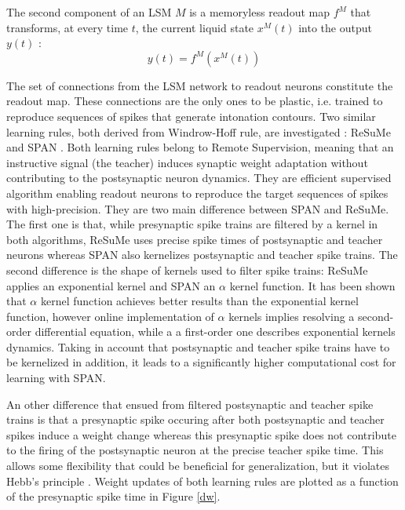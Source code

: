 \documentclass[11pt, a4paper]{article} %
\begin{document}
The second component of an LSM $M$ is a memoryless readout map $f^M$ that transforms, at every time $t$, the current liquid state $x^M(t)$ into the output $y(t)$ \cite{maass2002real}: \begin{equation}
y(t) = f^M(x^M(t))
\end{equation}

The set of connections from the LSM network to readout neurons constitute the readout map. These connections are the only ones to be plastic, i.e. trained to reproduce sequences of spikes that generate intonation contours. Two similar learning rules, both derived from Windrow-Hoff rule, are investigated : ReSuMe \cite{ponulak2006supervised, ponulak2010supervised} and SPAN \cite{mohemmed2012span, mohemmed2013training}. Both learning rules belong to Remote Supervision, meaning that an instructive signal (the teacher) induces synaptic weight adaptation without contributing to the postsynaptic neuron dynamics. They are efficient supervised algorithm enabling readout neurons to reproduce the target sequences of spikes with high-precision. They are two main difference between SPAN and ReSuMe. The first one is that, while presynaptic spike trains are filtered by a kernel in both algorithms, ReSuMe uses precise spike times of postsynaptic and teacher neurons whereas SPAN also kernelizes postsynaptic and teacher spike trains. The second difference is the shape of kernels used to filter spike trains: ReSuMe applies an exponential kernel and SPAN an $\alpha$ kernel function. It has been shown that $\alpha$ kernel  function achieves better results than the exponential kernel function, however online implementation of $\alpha$ kernels implies resolving a second-order differential equation, while a a first-order one describes exponential kernels dynamics. Taking in account that postsynaptic and teacher spike trains have to be kernelized in addition, it leads to a significantly higher computational cost for learning with SPAN.

An other difference that ensued from filtered postsynaptic and teacher spike trains is that a presynaptic spike occuring after both postsynaptic and teacher spikes induce a weight change whereas this presynaptic spike does not contribute to the firing of the postsynaptic neuron at the precise teacher spike time. This allows some flexibility that could be beneficial for generalization, but it violates Hebb's principle \cite{hebb1949organization}. Weight updates of both learning rules are plotted as a function of the presynaptic spike time in Figure \ref{dw}.
\end{document}
